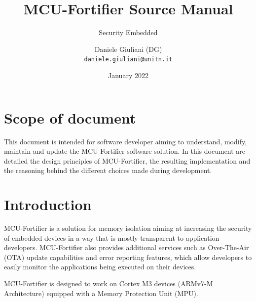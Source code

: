 \documentclass{article}
\title{
MCU-Fortifier Source Manual
}
\author{
Security Embedded\\
\texttt{}
\and
Daniele Giuliani (DG)\\
\texttt{daniele.giuliani@unitn.it}
}
\date{January 2022}
\begin{document}
\maketitle
\newpage
\begin{versionhistory}
\end{versionhistory}

\newpage
\tableofcontents


\newpage
\section{Scope of document}
This document is intended for software developer aiming to understand, modify, maintain and update the MCU-Fortifier software solution. In this document are detailed the design principles of MCU-Fortifier, the resulting implementation and the reasoning behind the different choices made during development.


\newpage
\section{Introduction}
\label{sec:intro}
MCU-Fortifier is a solution for memory isolation aiming at increasing the security of embedded devices in a way that is mostly transparent to application developers.
MCU-Fortifier also provides additional services such as Over-The-Air (OTA) update capabilities and error reporting features, which allow developers to easily monitor the applications being executed on their devices.

MCU-Fortifier is designed to work on Cortex M3 devices (ARMv7-M Architecture) equipped with a Memory Protection Unit (MPU).
\end{document}
